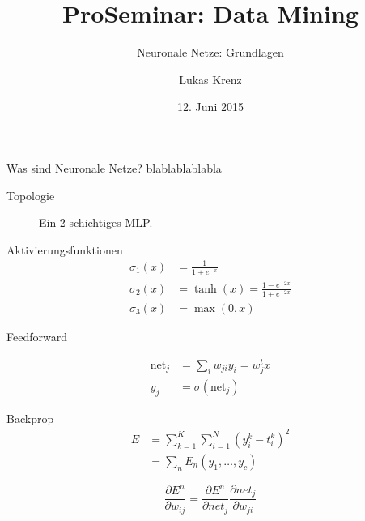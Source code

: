 \documentclass[10pt, compress, xetex]{beamer}
\title{ProSeminar: Data Mining}
\subtitle{Neuronale Netze: Grundlagen}
\author{Lukas Krenz}
\date{12. Juni 2015}
\institute{Technische Universität München}
\begin{document}
\begin{frame}
\titlepage
\end{frame}


\begin{frame}{Was sind Neuronale Netze?}
	blablablablabla
\end{frame}

\begin{frame}{Topologie}
\begin{figure}[ht!]
\label{fig:MLP}
  \centering
    
  \caption{Ein 2-schichtiges MLP.}
\end{figure}

\end{frame}

\begin{frame}{Aktivierungsfunktionen}
\begin{align}
	\sigma_1(x) & =  \frac{1}{1+e^{-x}} \\
	\sigma_2(x) & =  \tanh(x) = \frac{1-e^{-2x}}{1+e^{-2x}} \\
	\sigma_3(x) & =  \max(0,x)
\end{align}
\end{frame}

\begin{frame}{Feedforward}
\begin{figure}[ht!]
  \centering
\end{figure}

\begin{align}
	\text{net}_j & = \sum_{i} w_{ji} y_i = w_j^t x \\
	y_j & = \sigma (\text{net}_j)
\end{align} 
\end{frame}

\begin{frame}{Backprop}
\begin{align}
	E &= \sum_{k=1}^K \sum_{i=1}^N \left( y_i^k - t_i^k \right)^2 \\
	& =  \sum_n E_n(y_1, \ldots, y_c)
\end{align}

\begin{equation}
\frac{\partial E^n}{\partial w_{ij}} = \frac{\partial E^n}{\partial net_j}  \frac{\partial net_j }{\partial w_{ji}}
\end{equation}

\end{frame}
\end{document}
